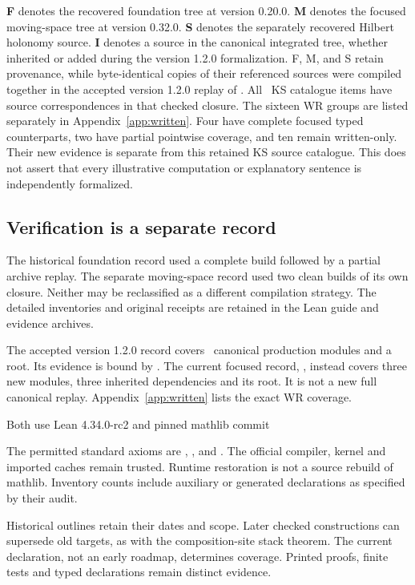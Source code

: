 \textbf{F} denotes the recovered foundation tree at version 0.20.0. \textbf{M} denotes the focused moving-space tree at version 0.32.0. \textbf{S} denotes the separately recovered Hilbert holonomy source. \textbf{I} denotes a source in the canonical integrated tree, whether inherited or added during the version 1.2.0 formalization. F, M, and S retain provenance, while byte-identical copies of their referenced sources were compiled together in the accepted version 1.2.0 replay of . All \EditionClaims\ KS catalogue items have source correspondences in that checked closure. The sixteen WR groups are listed separately in Appendix~\ref{app:written}. Four have complete focused typed counterparts, two have partial pointwise coverage, and ten remain written-only. Their new evidence is separate from this retained KS source catalogue. This does not assert that every illustrative computation or explanatory sentence is independently formalized.



\subsection{Verification is a separate record}
The historical foundation record used a complete build followed by a partial archive replay. The separate moving-space record used two clean builds of its own closure. Neither may be reclassified as a different compilation strategy. The detailed inventories and original receipts are retained in the Lean guide and evidence archives.

The accepted version 1.2.0 record covers \EditionFormalModules\ canonical production modules and a root. Its evidence is bound by . The current focused record, , instead covers three new modules, three inherited dependencies and its root. It is not a new full canonical replay. Appendix~\ref{app:written} lists the exact WR coverage.

Both use Lean 4.34.0-rc2 and pinned mathlib commit
\begin{quote}\small{}\end{quote}
The permitted standard axioms are , , and . The official compiler, kernel and imported caches remain trusted. Runtime restoration is not a source rebuild of mathlib. Inventory counts include auxiliary or generated declarations as specified by their audit.

Historical outlines retain their dates and scope. Later checked constructions can supersede old targets, as with the composition-site stack theorem. The current declaration, not an early roadmap, determines coverage. Printed proofs, finite tests and typed declarations remain distinct evidence.
